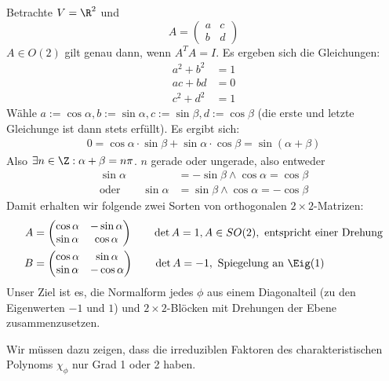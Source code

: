 \documentclass[a4paper, 10pt]{scrbook}
\begin{document}
Betrachte $V=\R^2$ und
\[
	A = \begin{pmatrix}a&c\\b&d\end{pmatrix}
\]
$A\in O(2)$ gilt genau dann, wenn $A^TA = I$.
Es ergeben sich die Gleichungen:
\begin{align*}
	a^2 + b^2 &= 1\\
	ac + bd &= 0\\
	c^2 + d^2 &= 1
\end{align*}
Wähle $a:=\cos \alpha, b:=\sin \alpha, c:= \sin \beta, d:= \cos \beta$ (die erste und letzte Gleichunge ist dann stets erfüllt).
Es ergibt sich:
\begin{align*}
	0 = \cos \alpha \cdot \sin \beta + \sin \alpha \cdot \cos \beta = \sin(\alpha + \beta)
\end{align*}
Also $\exists n\in \Z : \alpha + \beta = n\pi$.
$n$ gerade oder ungerade, also entweder
\begin{align*}
	\sin \alpha &= - \sin \beta \land \cos \alpha = \cos \beta\\
	\text{oder} \qquad \sin \alpha &= \sin \beta \land \cos \alpha = -\cos \beta
\end{align*}
Damit erhalten wir folgende zwei Sorten von orthogonalen $2\times 2$-Matrizen:
\begin{align*}
A &= \begin{pmatrix}\cos \alpha & -\sin \alpha \\ \sin \alpha & \cos \alpha \end{pmatrix} \qquad \det A = 1, A \in SO(2), \text{ entspricht einer Drehung} \\
B &= \begin{pmatrix}\cos \alpha & \sin \alpha \\ \sin \alpha & -\cos \alpha \end{pmatrix} \qquad \det A = -1,  \text{ Spiegelung an $\Eig(1)$} 
\end{align*}
Unser Ziel ist es, die Normalform jedes $\phi$ aus einem Diagonalteil (zu den Eigenwerten $-1$ und $1$) und $2\times 2$-Blöcken mit Drehungen der Ebene zusammenzusetzen.

Wir müssen dazu zeigen, dass die irreduziblen Faktoren des charakteristischen Polynoms $\chi_\phi$ nur Grad 1 oder 2 haben.
\end{document}
